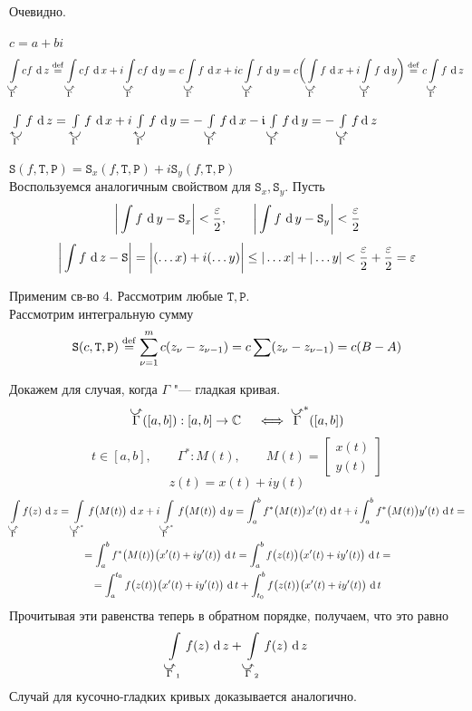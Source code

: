 \begin{eproof}
	\item Очевидно.

	\item $ c = a + bi $
	$$ \cint[z]{\curvedir\Gamma}{cf} \bydef \cint[x]{\curvedir\Gamma}{cf} + i \cint[y]{\curvedir\Gamma}{cf} = c \cint[x]{\curvedir\Gamma}f + ic \cint[y]{\curvedir\Gamma}f = c \bigg( \cint[x]{\curvedir\Gamma}f + i \cint[y]{\curvedir\Gamma}f \bigg) \bydef c \cint[z]{\curvedir\Gamma}f $$

	\item $ \cint[z]{\curvedir[0]\Gamma}f = \cint[x]{\curvedir[0]\Gamma}f + i \cint[y]{\curvedir[0]\Gamma}f = -\int\limits_{\curvedir \Gamma} f \di x - \ii \int\limits_{\curvedir \Gamma} f \di y = -\int\limits_{\curvedir \Gamma} f \di z $

	\item $ \mathtt S(f, \mathtt T, \mathtt P) = \mathtt S_x(f, \mathtt T, \mathtt P) + i \mathtt S_y(f, \mathtt T, \mathtt P) $ \\
	Воспользуемся аналогичным свойством для $ \mathtt S_x, \mathtt S_y $. Пусть
	$$ \bigg| \sint[y]f - \mathtt S_x \bigg| < \frac\eps2, \qquad \bigg| \sint[y]f - \mathtt S_y \bigg| < \frac\eps2 $$
	$$ \bigg| \sint[z]f - \mathtt S \bigg| = \bigg| (\dots x) + i(\dots y) \bigg| \le |\dots x| + |\dots y| < \frac\eps2 + \frac\eps2 = \eps $$

	\item Применим св-во 4. Рассмотрим любые $ \mathtt T, \mathtt P $. \\
	Рассмотрим интегральную сумму
	$$ \mathtt S(c, \mathtt T, \mathtt P) \bydef \sum_{\nu = 1}^m c(z_\nu - z_{\nu - 1}) = c \sum (z_\nu - z_{\nu - 1}) = c(B - A) $$

	\item Докажем для случая, когда $ \Gamma $ "--- гладкая кривая.
	$$ \curvedir\Gamma([a, b]) : [a, b] \to \Co \quad \iff \curvedir\Gamma^*([a, b]) $$
	$$ t \in [a, b], \qquad \Gamma^* : M(t), \qquad M(t) =
	\begin{bmatrix}
		x(t) \\
		y(t)
	\end{bmatrix} $$
	$$ z(t) = x(t) + iy(t) $$
	\begin{multline*}
		\cint[z]{\curvedir \Gamma}{f(z)} = \cint[x]{\curvedir\Gamma^*}{f \big( M(t) \big)} + i \cint[y]{\curvedir\Gamma^*}{f \big( M(t) \big)} = \dint[t]ab{ f^* \big( M(t) \big)x'(t)} + i \dint[t]ab{f^* \big( M(t) \big) y'(t)} = \\
		= \dint[t]ab{ f^* \big( M(t) \big) \big( x'(t) + iy'(t) \big)} = \dint[t]ab{f \big( z(t) \big) \big( x'(t) + iy'(t) \big)} = \\
		= \dint[t]a{t_0}{ f \big( z(t) \big) \big( x'(t) + iy'(t) \big)} + \dint[t]{t_0}b{ f \big( z(t) \big) \big( x'(t) + iy'(t) \big)}
	\end{multline*}
	Прочитывая эти равенства теперь в обратном порядке, получаем, что это равно
	$$ \cint[z]{\curvedir\Gamma_1}{f(z)} + \cint[z]{\curvedir\Gamma_2}{f(z)} $$
	Случай для кусочно-гладких кривых доказывается аналогично.


\end{eproof}
